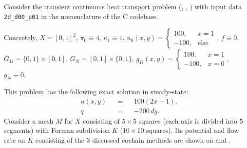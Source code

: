 \begin{example}
  \label{cmc/diffusion/continuous/transient/examples/2d_d00_p01-example}
  Consider the transient continuous heat transport problem
  (,
   ,
   )
  with input data \verb|2d_d00_p01| in the nomenclature of the C codebase.

  Concretely,
    $X = [0, 1]^2$,
    $\pi_0 \equiv 4$,
    $\kappa_1 \equiv 1$,
    $u_0(x, y) =
      \begin{cases}
        100, & x = 1 \\
        -100, & \text{else}
      \end{cases}$,
    $f \equiv 0$,
    $G_D = \{0, 1\} \times [0, 1]$,
    $G_N = [0, 1] \times \{0, 1\}$,
    $g_D(x, y) = 
      \begin{cases}
        100, & x = 1 \\
        -100, & x = 0
      \end{cases}$,
    $g_N \equiv 0$.

  This problem has the following exact solution in steady-state:
  \begin{subequations}
    \begin{alignat}{3}
      & u(x, y) && = && 100 (2 x - 1), \\
      & q && = && - 200\, d y.
    \end{alignat}
  \end{subequations}
  Consider a mesh $M$ for $X$ consisting of $5 \times 5$ squares (each axis is
  divided into $5$ segments) with Forman subdivision $K$
  ($10 \times 10$ squares).
  Its potential and flow rate on $K$ consisting of the $3$ discussed cochain
  methods are shown on
  and
  .
\end{example}
